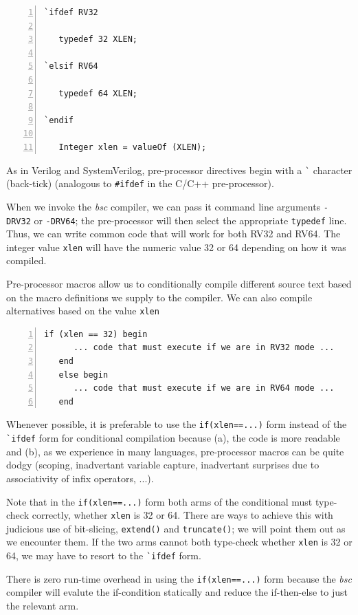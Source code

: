 \begin{Verbatim}[frame=single, numbers=left]
`ifdef RV32

   typedef 32 XLEN;

`elsif RV64

   typedef 64 XLEN;

`endif

   Integer xlen = valueOf (XLEN);
\end{Verbatim}

As in Verilog and SystemVerilog, pre-processor directives begin with a
\verb|`| character (back-tick) (analogous to \verb|#ifdef| in the
C/C++ pre-processor).

When we invoke the \emph{bsc} compiler, we can pass it command line
arguments \verb|-DRV32| or \verb|-DRV64|; the pre-processor will then
select the appropriate \verb|typedef| line.  Thus, we can write common
code that will work for both RV32 and RV64.  The integer value
\verb|xlen| will have the numeric value 32 or 64 depending on how it
was compiled.

Pre-processor macros allow us to conditionally compile different
source text based on the macro definitions we supply to the compiler.
We can also compile alternatives based on the value \verb|xlen|

\begin{Verbatim}[frame=single, numbers=left]
   if (xlen == 32) begin
      ... code that must execute if we are in RV32 mode ...
   end
   else begin
      ... code that must execute if we are in RV64 mode ...
   end
\end{Verbatim}

Whenever possible, it is preferable to use the \verb|if(xlen==...)|
form instead of the \verb|`ifdef| form for conditional compilation
because (a), the code is more readable and (b), as we experience in
many languages, pre-processor macros can be quite dodgy (scoping,
inadvertant variable capture, inadvertant surprises due to
associativity of infix operators, ...).

Note that in the \verb|if(xlen==...)| form both arms of the
conditional must type-check correctly, whether \verb|xlen| is 32 or
64.  There are ways to achieve this with judicious use of bit-slicing,
\verb|extend()| and \verb|truncate()|; we will point them out as we
encounter them.  If the two arms cannot both type-check whether
\verb|xlen| is 32 or 64, we may have to resort to the \verb|`ifdef|
form.

There is zero run-time overhead in using the \verb|if(xlen==...)| form
because the \emph{bsc} compiler will evalute the if-condition
statically and reduce the if-then-else to just the relevant arm.

